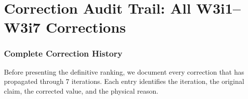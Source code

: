 \documentclass[11pt]{article}
\theoremstyle{definition}
\theoremstyle{remark}
\begin{document}
\part{Correction Audit Trail: All W3i1--W3i7 Corrections}
\label{part:audit}

\section{Complete Correction History}
\label{sec:correction_history}

Before presenting the definitive ranking, we document every correction
that has propagated through 7 iterations. Each entry identifies the
iteration, the original claim, the corrected value, and the physical
reason.
\end{document}
